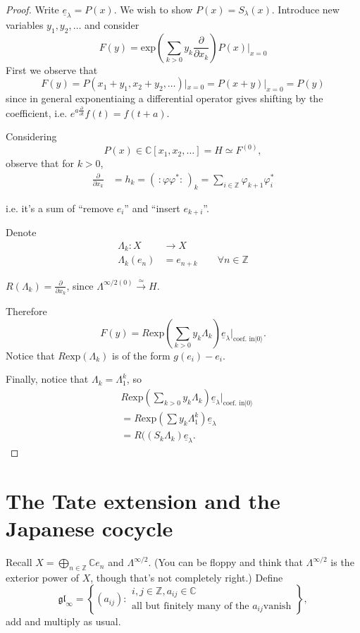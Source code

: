 \begin{proof}
Write $\underline{e}_\lambda=P(x)$.
We wish to show $P(x)=S_\lambda(x)$.
Introduce new variables $y_1,y_2,\ldots$ and
consider
$$
F(y)=\text{exp}
\left(\sum_{k>0}y_k\frac{\partial }{\partial
x_k}\right)P(x)\Big|_{x=0}
$$
First we observe that
$$
F(y)=P(x_1+y_1,x_2+y_2,\ldots)|_{x=0}=P(x+y)
|_{x=0}=P(y)
$$
since in general exponentiaing a differential
operator
gives shifting by the coefficient, i.e.
$e^{a \frac{\partial }{\partial
t}}f(t)=f(t+a)$.

Considering
$$
P(x) \in \mathbb{C}[x_1,x_2,\ldots]=H\simeq
F^{(0)},
$$
observe that for $k>0$,
$$
\begin{aligned}
\frac{\partial }{\partial x_k}&=h_k
=(\,:\!\varphi \varphi^*\!:\,)_k
=\sum_{i \in
\mathbb{Z}}\varphi_{k+1}\varphi^*_i
\end{aligned}
$$

\noindent
i.e. it's a sum of ``remove $e_i$'' and
``insert $e_{k+i}$''.

Denote
$$
\begin{aligned}
\Lambda_k: X &\longrightarrow X \\
\Lambda_k(e_n) &=e_{n+k}\qquad  \forall n \in
\mathbb{Z}
\end{aligned}
$$

\noindent
$R(\Lambda_k)=\frac{\partial }{\partial
x_k}$,
since
$\Lambda^{\infty/2(0)}\xrightarrow{\simeq}H$.

Therefore
$$
F(y)=R \text{exp}\left(\sum_{k>0}y_k
\Lambda_k\right)
\underline{e}_\lambda\Big|_{\text{coef. in
}|0\rangle}.
$$
Notice that $R \text{exp}(\Lambda_k)$ is of
the form
$g(e_i)-e_i$.

Finally, notice that $\Lambda_k=\Lambda_1^k$,
so
$$
\begin{aligned}
&R \text{exp}\left(\sum_{k>0}y_k
\Lambda_k\right)
\underline{e}_\lambda\Big|_{\text{coef. in
}|0\rangle}\\
&=R \text{exp}\left(\sum y_k
\Lambda_1^k\right)\underline{e}_\lambda\\
&=R(\left(S_k
\Lambda_k\right)\underline{e}_\lambda.
\end{aligned}
$$
\end{proof}


\section{The Tate extension and the Japanese
cocycle}
\label{section-tate-exten-japan-cocyc}

\noindent
Recall $X=\bigoplus_{n \in
\mathbb{Z}}\mathbb{C}e_n$
and $\Lambda^{\infty/2}$.
(You can be floppy and think that
$\Lambda^{\infty/2}$
is the exterior power of $X$,
though that's not completely right.)
Define
$$
\mathfrak{gl}_\infty
=\left\{(a_{ij}):\substack{i,j \in
\mathbb{Z},a_{ij}\in \mathbb{C} \\
\text{all but finitely many of the $a_{ij}$
vanish}}\right\},
$$
add and multiply as usual.

